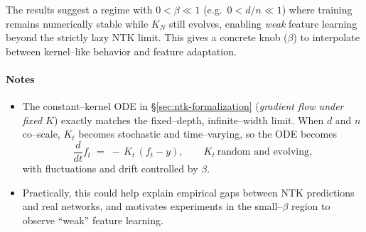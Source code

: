 \begin{remark}
	The results suggest a regime with $0<\beta\ll 1$ (e.g.\ $0<d/n\ll 1$) where training remains numerically stable while $K_N$ still evolves, enabling \emph{weak} feature learning beyond the strictly lazy NTK limit. This gives a concrete knob ($\beta$) to interpolate between kernel--like behavior and feature adaptation.
\end{remark}

\paragraph{Notes}
\begin{itemize}
	\item The constant--kernel ODE in \S\ref{sec:ntk-formalization} (\emph{gradient flow under fixed $K$}) exactly matches the fixed--depth, infinite--width limit. When $d$ and $n$ co--scale, $K_t$ becomes stochastic and time--varying, so the ODE becomes
	      \[
		      \frac{d}{dt} f_t \;=\; -\,K_t\,(f_t - y),\qquad K_t\ \text{random and evolving},
	      \]
	      with fluctuations and drift controlled by $\beta$.
	\item Practically, this could help explain empirical gaps between NTK predictions and real networks, and motivates experiments in the small--$\beta$ region to observe ``weak'' feature learning.
\end{itemize}

